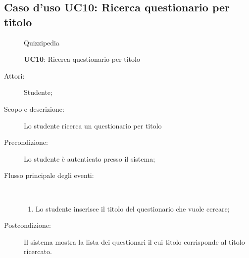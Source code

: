 \subsection{Caso d'uso UC10: Ricerca questionario per titolo}
	\begin{figure}[H]
		\centering
		\begin{resizedtikzpicture}{\textwidth}
		\begin{umlsystem}[x=0, fill=lightgray!20]{Quizzipedia}
		\end{umlsystem}
		\end{resizedtikzpicture}
		\caption{\textbf{UC10}: Ricerca questionario per titolo}
		\label{UC10}
	\end{figure}
\begin{description}
\item[Attori:] Studente;
\item[Scopo e descrizione:] Lo studente ricerca un questionario per titolo
      \item[Precondizione:] Lo studente è autenticato presso il sistema;

        \item[Flusso principale degli eventi:] \ 
 \begin{enumerate}
          \item Lo studente inserisce il titolo del questionario che vuole cercare;

      \end{enumerate}
    \item[Postcondizione:] Il sistema mostra la lista dei questionari il cui titolo corrisponde al titolo ricercato.
  \end{description}
\hypertarget{UC11}{}
